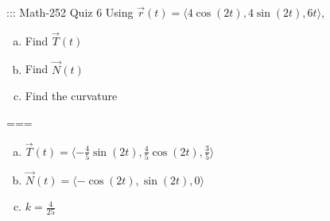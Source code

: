 ::: Math-252 Quiz 6
Using \(\vec r(t)=\langle 4\cos(2t),4\sin(2t),6t\rangle\),
\begin{enumerate}[a.]
  \item Find \(\vec T(t)\)
  \item Find \(\vec N(t)\)
  \item Find the curvature
\end{enumerate}
===
\begin{enumerate}[a.]
  \item \(\vec T(t)=
    \langle-\frac{4}{5}\sin(2t),\frac{4}{5}\cos(2t),\frac{3}{5}\rangle\)
  \item \(\vec N(t)=
    \langle-\cos(2t),\sin(2t),0\rangle\)
  \item \(k=\frac{4}{25}\)
\end{enumerate}
